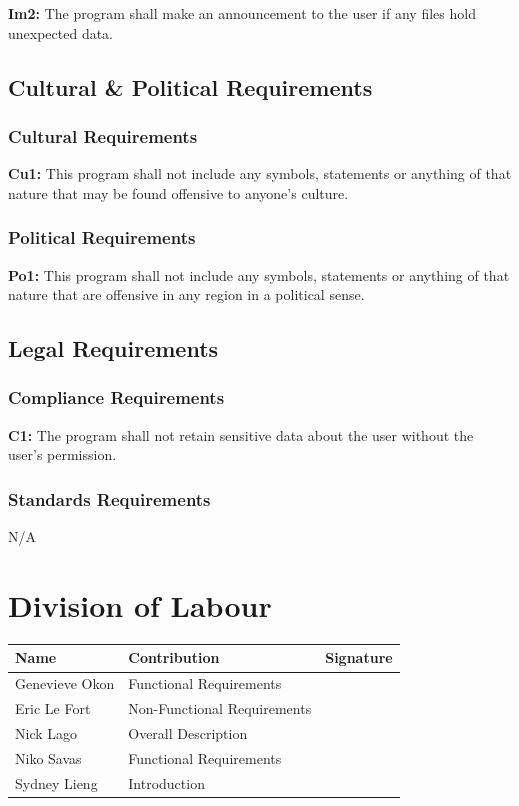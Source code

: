\documentclass[titlepage]{article}
\begin{document}
\noindent\textbf{Im2:} The program shall make an announcement to the user if any files hold unexpected data.

\subsection{Cultural \& Political Requirements}
\subsubsection{Cultural Requirements}
\textbf{Cu1:} This program shall not include any symbols, statements or anything of that nature that may be found offensive to anyone's culture.
\subsubsection{Political Requirements}
\textbf{Po1:} This program shall not include any symbols, statements or anything of that nature that are offensive in any region in a political sense.

\subsection{Legal Requirements}
\subsubsection{Compliance Requirements}
\textbf{C1:} The program shall not retain sensitive data about the user without the user's permission.
\subsubsection{Standards Requirements}
N/A


\appendix
\newpage
\section{Division of Labour}
\label{sec:division_of_labour}
\begin{center}
\begin{tabular}{ | p{6cm} | p{6cm}| p{4cm} | } 
\hline
Name& Contribution & Signature\\ 
\hline
Genevieve Okon & Functional Requirements & \\ 
\hline
Eric Le Fort& Non-Functional Requirements&  \\ 
\hline
Nick Lago& Overall Description  &   \\ 
\hline
Niko Savas& Functional Requirements&   \\ 
\hline
Sydney Lieng& Introduction&   \\ 
\hline
\end{tabular}
\end{center}
\end{document}

